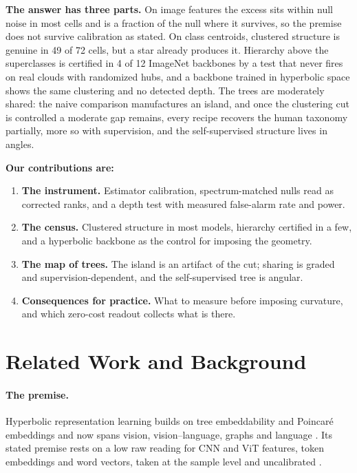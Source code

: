 \documentclass{article}
\begin{document}
\textbf{The answer has three parts.} On image features the excess sits within null noise in most cells and is a fraction of the null where it survives, so the premise does not survive calibration as stated. On class centroids, clustered structure is genuine in 49 of 72 cells, but a star already produces it. Hierarchy above the superclasses is certified in 4 of 12 ImageNet backbones by a test that never fires on real clouds with randomized hubs, and a backbone trained in hyperbolic space shows the same clustering and no detected depth. The trees are moderately shared: the naive comparison manufactures an island, and once the clustering cut is controlled a moderate gap remains, every recipe recovers the human taxonomy partially, more so with supervision, and the self-supervised structure lives in angles. %

\textbf{Our contributions are:}
\begin{enumerate}[topsep=0pt,itemsep=1pt,leftmargin=*]
\item \textbf{The instrument.} Estimator calibration, spectrum-matched nulls read as corrected ranks, and a depth test with measured false-alarm rate and power.
\item \textbf{The census.} Clustered structure in most models, hierarchy certified in a few, and a hyperbolic backbone as the control for imposing the geometry.
\item \textbf{The map of trees.} The island is an artifact of the cut; sharing is graded and supervision-dependent, and the self-supervised tree is angular.
\item \textbf{Consequences for practice.} What to measure before imposing curvature, and which zero-cost readout collects what is there.
\end{enumerate}


\section{Related Work and Background}
\label{sec:related}

\paragraph{The premise.} Hyperbolic representation learning builds on tree embeddability and Poincar\'{e} embeddings and now spans vision, vision--language, graphs and language \citep{sarkar2011low, nickel2017poincare, ganea2018hyperbolic, chami2019hyperbolic}. Its stated premise rests on a low raw reading for CNN and ViT features, token embeddings and word vectors, taken at the sample level and uncalibrated \citep{Khrulkov_2020_CVPR, bdeir2024fully, yang2025hyperbolic, tifrea2019poincare}.
\end{document}
